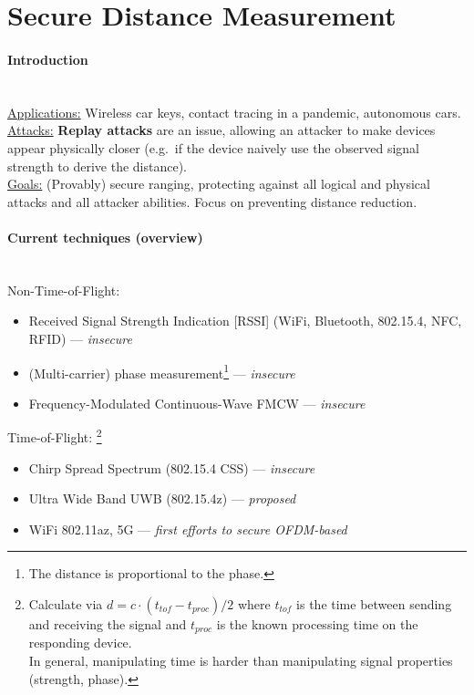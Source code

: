\section{Secure Distance Measurement}

\paragraph{Introduction} \mbox{} \\
\underline{Applications:}
Wireless car keys, contact tracing in a pandemic, autonomous cars.
\\
\underline{Attacks:}
\textbf{Replay attacks} are an issue, allowing an attacker to make devices appear physically closer (e.g.\ if the device naively use the observed signal strength to derive the distance).
\\
\underline{Goals:}
(Provably) secure ranging, protecting against all logical and physical attacks and all attacker abilities.
Focus on preventing distance reduction.

\paragraph{Current techniques (overview)} \mbox{} \\
Non-Time-of-Flight:
\begin{itemize}
	\item Received Signal Strength Indication [RSSI] (WiFi, Bluetooth, 802.15.4, NFC, RFID) --- \textit{insecure}
	\item (Multi-carrier) phase measurement\footnote{The distance is proportional to the phase.}
		--- \textit{insecure}
	\item Frequency-Modulated Continuous-Wave FMCW --- \textit{insecure}
\end{itemize}

Time-of-Flight:%
\footnote{
	Calculate via $d = c \cdot (t_{tof} - t_{proc}) / 2$
	where $t_{tof}$ is the time between sending and receiving the signal and $t_{proc}$ is the known processing time on the responding device. \\
	In general, manipulating time is harder than manipulating signal properties (strength, phase).}
\begin{itemize}
	\item Chirp Spread Spectrum (802.15.4 CSS) --- \textit{insecure}
	\item Ultra Wide Band UWB (802.15.4z) --- \textit{proposed}
	\item WiFi 802.11az, 5G --- \textit{first efforts to secure OFDM-based}
\end{itemize}


